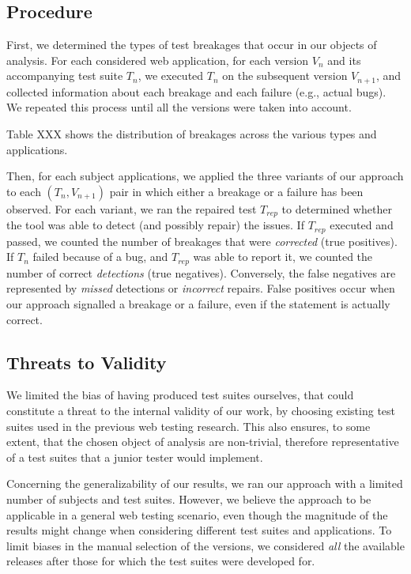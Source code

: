 \subsection{Procedure}\label{sec:procedure}

First, we determined the types of test breakages that occur in our objects of analysis. For each considered web application, for each version $V_n$ and its accompanying test suite $T_n$, we executed $T_n$ on the subsequent version $V_{n+1}$, and collected information about each breakage and each failure (e.g., actual bugs). We repeated this process until all the versions were taken into account. 

Table XXX shows the distribution of breakages across the various types and applications. 

Then, for each subject applications, we applied the three variants of our approach to each $(T_n,V_{n+1})$ pair in which either a breakage or a failure has been observed. For each variant, we ran the repaired test $T_{rep}$ to determined whether the tool was able to detect (and possibly repair) the issues. If $T_{rep}$ executed and passed, we counted the number of breakages that were \textit{corrected} (true positives). If $T_n$ failed because of a bug, and $T_{rep}$ was able to report it, we counted the number of correct \textit{detections} (true negatives). Conversely, the false negatives are represented by \textit{missed} detections or \textit{incorrect} repairs. False positives occur when our approach signalled a breakage or a failure, even if the statement is actually correct.


\subsection{Threats to Validity}\label{sec:ttv}

 We limited the bias of having produced test suites ourselves, that could constitute a threat to the internal validity of our work, by choosing existing test suites used in the previous web testing research. This also ensures, to some extent, that the chosen object of analysis are non-trivial, therefore representative of a test suites that a junior tester would implement. 

 Concerning the generalizability of our results, we ran our approach with a limited number of subjects and test suites. However, we believe the approach to be applicable in a general web testing scenario, even though the magnitude of the results might change when considering different test suites and applications. To limit biases in the manual selection of the versions, we considered \textit{all} the available releases after those for which the test suites were developed for.
 

